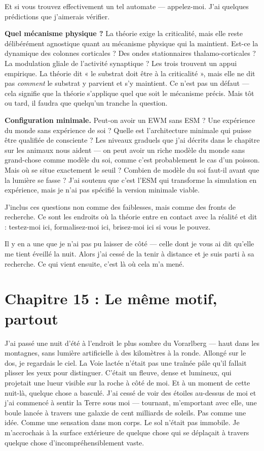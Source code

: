 \documentclass[11pt, twoside, openright]{book}
\begin{document}
Et si vous trouvez effectivement un tel automate --- appelez-moi. J'ai quelques prédictions que j'aimerais vérifier.

\textbf{Quel mécanisme physique ?} La théorie exige la criticalité, mais elle reste délibérément agnostique quant au mécanisme physique qui la maintient. Est-ce la dynamique des colonnes corticales ? Des ondes stationnaires thalamo-corticales ? La modulation gliale de l'activité synaptique ? Les trois trouvent un appui empirique. La théorie dit « le substrat doit être à la criticalité », mais elle ne dit pas \textit{comment} le substrat y parvient et s'y maintient. Ce n'est pas un défaut --- cela signifie que la théorie s'applique quel que soit le mécanisme précis. Mais tôt ou tard, il faudra que quelqu'un tranche la question.

\textbf{Configuration minimale.} Peut-on avoir un EWM sans ESM ? Une expérience du monde sans expérience de soi ? Quelle est l'architecture minimale qui puisse être qualifiée de consciente ? Les niveaux graduels que j'ai décrits dans le chapitre sur les animaux nous aident --- on peut avoir un riche modèle du monde sans grand-chose comme modèle du soi, comme c'est probablement le cas d'un poisson. Mais où se situe exactement le seuil ? Combien de modèle du soi faut-il avant que la lumière se fasse ? J'ai soutenu que c'est l'ESM qui transforme la simulation en expérience, mais je n'ai pas spécifié la version minimale viable.

J'inclus ces questions non comme des faiblesses, mais comme des fronts de recherche. Ce sont les endroits où la théorie entre en contact avec la réalité et dit : testez-moi ici, formalisez-moi ici, brisez-moi ici si vous le pouvez.

Il y en a une que je n'ai pas pu laisser de côté --- celle dont je vous ai dit qu'elle me tient éveillé la nuit. Alors j'ai cessé de la tenir à distance et je suis parti à sa recherche. Ce qui vient ensuite, c'est là où cela m'a mené.


\chapter*{Chapitre 15 : Le même motif, partout}

J'ai passé une nuit d'été à l'endroit le plus sombre du Vorarlberg --- haut dans les montagnes, sans lumière artificielle à des kilomètres à la ronde. Allongé sur le dos, je regardais le ciel. La Voie lactée n'était pas une traînée pâle qu'il fallait plisser les yeux pour distinguer. C'était un fleuve, dense et lumineux, qui projetait une lueur visible sur la roche à côté de moi. Et à un moment de cette nuit-là, quelque chose a basculé. J'ai cessé de voir des étoiles au-dessus de moi et j'ai commencé à sentir la Terre sous moi --- tournant, m'emportant avec elle, une boule lancée à travers une galaxie de cent milliards de soleils. Pas comme une idée. Comme une sensation dans mon corps. Le sol n'était pas immobile. Je m'accrochais à la surface extérieure de quelque chose qui se déplaçait à travers quelque chose d'incompréhensiblement vaste.
\end{document}
